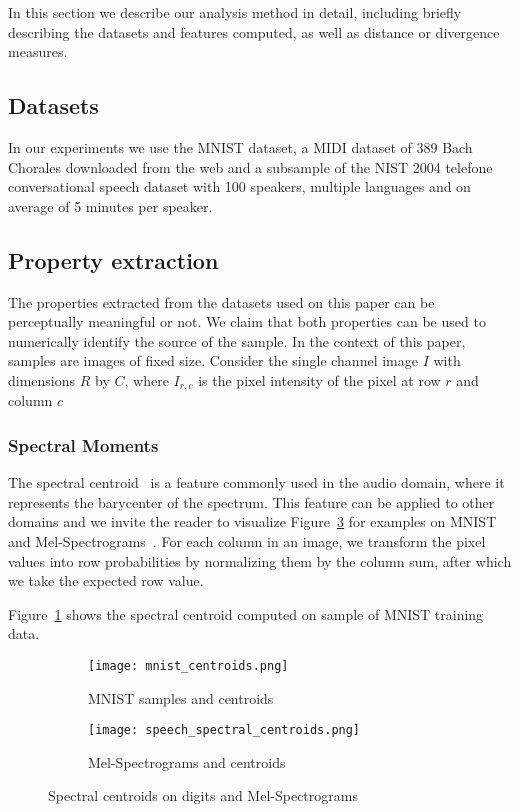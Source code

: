 In this section we describe our analysis method in detail, including
briefly describing the datasets and features computed, as well as distance
or divergence measures. \subsection{Datasets}
In our experiments we use the MNIST dataset, a MIDI dataset of 389 Bach Chorales downloaded from the web and a subsample of the NIST 2004 telefone
conversational speech dataset with 100 speakers, multiple languages and
on average of 5 minutes per speaker.

\subsection{Property extraction}
The properties extracted from the datasets used on this paper can be
perceptually meaningful or not. We claim that both properties can be used to numerically identify the source of the sample. In the context of this
paper, samples are images of fixed size. Consider the single channel image $I$ with dimensions $R$ by $C$, where $I_{r, c}$ is the pixel intensity of the pixel at row $r$ and column $c$

\subsubsection{Spectral Moments}
The spectral centroid~\cite{peeters2004large} is a feature commonly used in the
audio domain, where it represents the barycenter of the spectrum. This feature
can be applied to other domains and we invite the reader to visualize 
Figure~\ref{fig:centroids} for examples on MNIST and
Mel-Spectrograms~\cite{peeters2004large}. For each column in an image, we 
transform the pixel values into row probabilities by normalizing them by the
column sum, after which we take the expected row value. 


Figure~\ref{fig:mnist_centroids} shows the spectral centroid computed
on sample of MNIST training data.

\begin{figure}[!h]
    \centering
    \begin{subfigure}[b]{0.4\textwidth}
        \texttt{[image: mnist\_centroids.png]}
        \caption{MNIST samples and centroids}
        \label{fig:mnist_centroids}
    \end{subfigure}
    \quad
    \begin{subfigure}[b]{0.4\textwidth}
        \texttt{[image: speech\_spectral\_centroids.png]}
        \caption{Mel-Spectrograms and centroids}
        \label{fig:spectrogram_centroids}
    \end{subfigure}
    \caption{Spectral centroids on digits and Mel-Spectrograms}
    \label{fig:centroids}
\end{figure}

